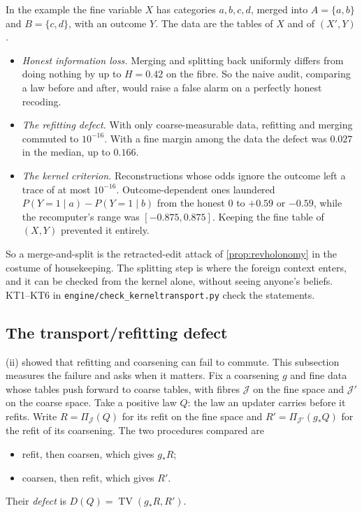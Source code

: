 \documentclass[11pt]{article}
\theoremstyle{definition}\newtheorem{definition}[theorem]{Definition}\newtheorem{remark}[theorem]{Remark}\newtheorem{example}[theorem]{Example}\newtheorem{problem}[theorem]{Open problem}\crefname{problem}{Problem}{Problems}
\begin{document}
In the example the fine variable $X$ has categories $a,b,c,d$, merged into $A=\{a,b\}$ and $B=\{c,d\}$, with an outcome $Y$. The data are the tables of $X$ and of $(X',Y)$.
\begin{itemize}
\item \emph{Honest information loss.} Merging and splitting back uniformly differs from doing nothing by up to $H=0.42$ on the fibre. So the naive audit, comparing a law before and after, would raise a false alarm on a perfectly honest recoding.
\item \emph{The refitting defect.} With only coarse-measurable data, refitting and merging commuted to $10^{-16}$. With a fine margin among the data the defect was $0.027$ in the median, up to $0.166$.
\item \emph{The kernel criterion.} Reconstructions whose odds ignore the outcome left a trace of at most $10^{-16}$. Outcome-dependent ones laundered $P(Y{=}1\mid a)-P(Y{=}1\mid b)$ from the honest $0$ to $+0.59$ or $-0.59$, while the recomputer's range was $[-0.875,0.875]$. Keeping the fine table of $(X,Y)$ prevented it entirely.
\end{itemize}

So a merge-and-split is the retracted-edit attack of \cref{prop:revholonomy} in the costume of housekeeping. The splitting step is where the foreign context enters, and it can be checked from the kernel alone, without seeing anyone's beliefs. KT1--KT6 in \texttt{engine/check\_kerneltransport.py} check the statements.

\subsection{The transport/refitting defect}\label{sec:refitdefect}
(ii) showed that refitting and coarsening can fail to commute. This subsection measures the failure and asks when it matters. Fix a coarsening $g$ and fine data whose tables push forward to coarse tables, with fibres $\mathcal J$ on the fine space and $\mathcal J'$ on the coarse space. Take a positive law $Q$: the law an updater carries before it refits. Write $R=\Pi_{\mathcal J}(Q)$ for its refit on the fine space and $R'=\Pi_{\mathcal J'}(g_*Q)$ for the refit of its coarsening. The two procedures compared are
\begin{itemize}
\item refit, then coarsen, which gives $g_*R$;
\item coarsen, then refit, which gives $R'$.
\end{itemize}
Their \emph{defect} is $D(Q)=\operatorname{TV}(g_*R,R')$.
\end{document}

